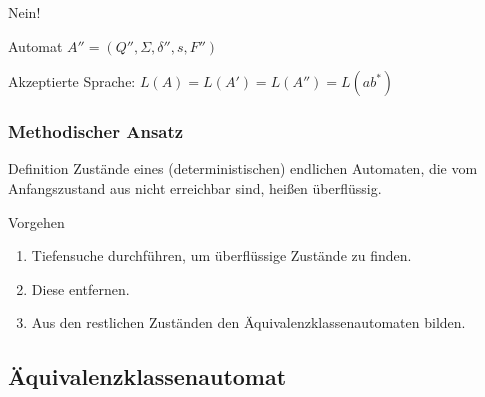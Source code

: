 \begin{frame}
Nein!
\begin{block}{Automat \(A'' = (Q'', \Sigma, \delta'', s, F'')\)}
 \begin{figure}[H]
\begin{center}
\end{center}
\end{figure}
\end{block}
\begin{block}{}
 Akzeptierte Sprache: \(L(A) = L(A') = L(A'') = L(ab^*) \)
\end{block}
\end{frame}
\begin{frame}
 \frametitle{Methodischer Ansatz}
 \begin{block}{Definition}
  Zustände eines (deterministischen) endlichen Automaten, die vom Anfangszustand aus nicht erreichbar sind, heißen überflüssig.
 \end{block}
\begin{block}{Vorgehen}
 \begin{enumerate}
  \item Tiefensuche durchführen, um überflüssige Zustände zu finden.
  \item Diese entfernen.
  \item Aus den restlichen Zuständen den Äquivalenzklassenautomaten bilden.
 \end{enumerate}
\end{block}
\end{frame}

\subsection{Äquivalenzklassenautomat}

